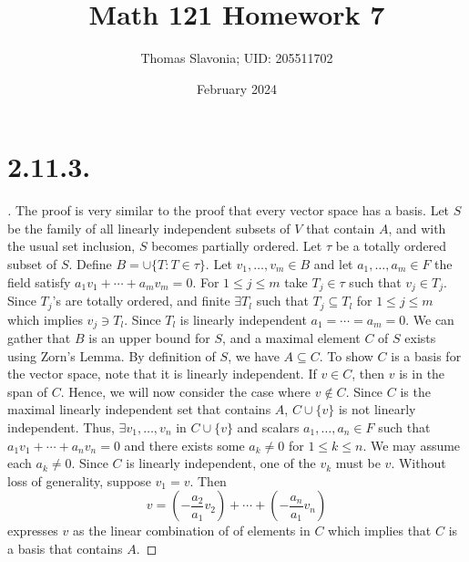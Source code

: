 \documentclass{article}
\title{Math 121 Homework 7}
\author{Thomas Slavonia; UID: 205511702}
\date{February 2024}
\begin{document}
\maketitle

\section*{2.11.3.}
\begin{proof}[\unskip\nopunct]
    The proof is very similar to the proof that every vector space has a basis. Let $S$ be the family of all linearly independent subsets of $V$ that contain $A$, and with the usual set inclusion, $S$ becomes partially ordered. Let $\tau$ be a totally ordered subset of $S$. Define $B = \cup \{T : T \in \tau \}$. Let $v_1, \ldots , v_m \in B$ and let $a_1, \ldots , a_m \in F$ the field satisfy $a_1v_1 + \cdots + a_mv_m = 0$. For $1 \leq j \leq m$ take $T_j \in \tau$ such that $v_j \in T_j$. Since $T_j$'s are totally ordered, and finite $\exists T_{l}$ such that $T_j \subseteq T_l$ for $1 \leq j \leq m$ which implies $v_j \ni T_l$. Since $T_l$ is linearly independent $a_1 = \cdots = a_m = 0$. We can gather that $B$ is an upper bound for $S$, and a maximal element $C$ of $S$ exists using Zorn's Lemma. By definition of $S$, we have $A \subseteq C$. To show $C$ is a basis for the vector space, note that it is linearly independent. If $v \in C$, then $v$ is in the span of $C$. Hence, we will now consider the case where $v \notin C$. Since $C$ is the maximal linearly independent set that contains $A$, $C \cup \{v\}$ is not linearly independent. Thus, $\exists v_1, \ldots , v_n$ in $C \cup \{v\}$ and scalars $a_1 , \ldots , a_n \in F$ such that $a_1v_1 + \cdots + a_n v_n = 0$ and there exists some $a_k \neq 0$ for $1 \leq k \leq n$. We may assume each $a_k \neq 0$. Since $C$ is linearly independent, one of the $v_k$ must be $v$. Without loss of generality, suppose $v_1 = v$. Then 
    \[
        v = \left(-\frac{a_2}{a_1}v_2 \right) + \cdots + \left(-\frac{a_n}{a_1}v_n\right)
        \]  
    expresses $v$ as the linear combination of of elements in $C$ which implies that $C$ is a basis that contains $A$. 

\end{proof}
\end{document}
